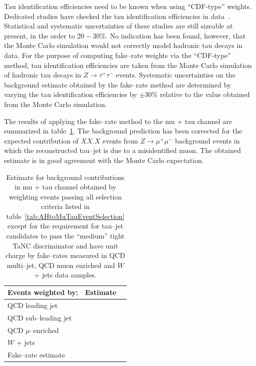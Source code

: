 Tau identification efficiencies need to be known when using ``CDF-type''
weights.  Dedicated studies have checked the tau identification efficiencies in
data~\cite{tauIdEff01,tauIdEff02}.  Statistical and systematic uncertainties of
these studies are still sizeable at present, in the order to $20-30\%$.  No
indication has been found, however, that the Monte Carlo simulation would not
correctly model hadronic tau decays in data.  For the purpose of computing
fake--rate weights via the ``CDF-type'' method, tau identification efficiencies
are taken from the Monte Carlo simulation of hadronic tau decays in $Z \to
\tau^{+} \tau^{-}$ events.  Systematic uncertainties on the background estimate
obtained by the fake--rate method are determined by varying the tau
identification efficiencies by $\pm 30\%$ relative to the value obtained from
the Monte Carlo simulation.

The results of applying the fake--rate method to the mu + tau channel are
summarized in table~\ref{tab:MuTauFakeRateResultsOS}.  The background prediction
has been corrected for the expected contribution of $XX.X$ events from $Z \to
\mu^{+} \mu^{-}$ background events in which the reconstructed tau--jet is due to
a misidentified muon.  The obtained estimate is in good agreement with the Monte
Carlo expectation.

\begin{table}[t]
\begin{center}
\tablesize
\begin{tabular}{|l|c|c|}
\hline
Events weighted by: & Estimate \\
\hline
QCD leading jet       & \\
QCD sub--leading jet      & \\
QCD $\mu$--enriched & \\
$W$ + jets          & \\
\hline
Fake--rate estimate & \\
\hline
\end{tabular}
\end{center}
\begin{center}
\caption{Estimate for background contributions in mu + tau channel obtained by
weighting events passing all selection criteria listed in
table~\ref{tab:AHtoMuTauEventSelection} except for the requirement for tau--jet
candidates to pass the ``medium'' tight TaNC discriminator and have unit charge
by fake--rates measured in QCD multi--jet, QCD muon enriched and $W$ + jets data
samples.} \label{tab:MuTauFakeRateResultsOS}
\end{center}
\end{table}

